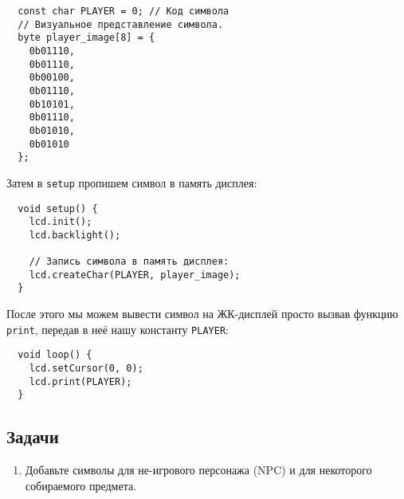 \documentclass[../sparc.tex]{subfiles}
\begin{document}
\begin{verbatim}
  const char PLAYER = 0; // Код символа
  // Визуальное представление символа.
  byte player_image[8] = {
    0b01110,
    0b01110,
    0b00100,
    0b01110,
    0b10101,
    0b01110,
    0b01010,
    0b01010
  };
\end{verbatim}

Затем в \texttt{setup} пропишем символ в память дисплея:

\begin{verbatim}
  void setup() {
    lcd.init();
    lcd.backlight();

    // Запись символа в память дисплея:
    lcd.createChar(PLAYER, player_image);
  }
\end{verbatim}

После этого мы можем вывести символ на ЖК-дисплей просто вызвав функцию
\texttt{print}, передав в неё нашу константу \texttt{PLAYER}:

\begin{verbatim}
  void loop() {
    lcd.setCursor(0, 0);
    lcd.print(PLAYER);
  }
\end{verbatim}

\subsection{Задачи}
\begin{enumerate}
\item Добавьте символы для не-игрового персонажа (\gls{NPC}) и для некоторого
  собираемого предмета.
\end{enumerate}
\end{document}

